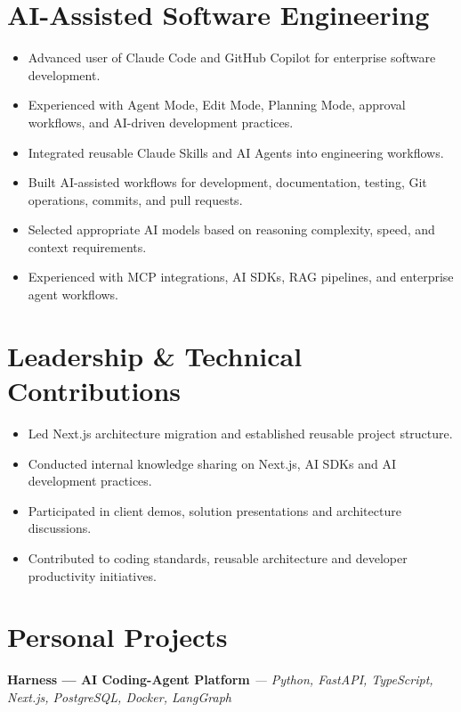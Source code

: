 \documentclass[a4paper,10pt]{article}
\newcommand{\projecttitle}[2]{\noindent\textbf{#1} \textit{#2}\par\vspace{1pt}}
\begin{document}
\section*{AI-Assisted Software Engineering}
\begin{itemize}
\item Advanced user of Claude Code and GitHub Copilot for enterprise software development.
\item Experienced with Agent Mode, Edit Mode, Planning Mode, approval workflows, and AI-driven development practices.
\item Integrated reusable Claude Skills and AI Agents into engineering workflows.
\item Built AI-assisted workflows for development, documentation, testing, Git operations, commits, and pull requests.
\item Selected appropriate AI models based on reasoning complexity, speed, and context requirements.
\item Experienced with MCP integrations, AI SDKs, RAG pipelines, and enterprise agent workflows.
\end{itemize}

\section*{Leadership \& Technical Contributions}
\begin{itemize}
\item Led Next.js architecture migration and established reusable project structure.
\item Conducted internal knowledge sharing on Next.js, AI SDKs and AI development practices.
\item Participated in client demos, solution presentations and architecture discussions.
\item Contributed to coding standards, reusable architecture and developer productivity initiatives.
\end{itemize}

\section*{Personal Projects}

\projecttitle{Harness --- AI Coding-Agent Platform}{--- Python, FastAPI, TypeScript, Next.js, PostgreSQL, Docker, LangGraph}
\end{document}
